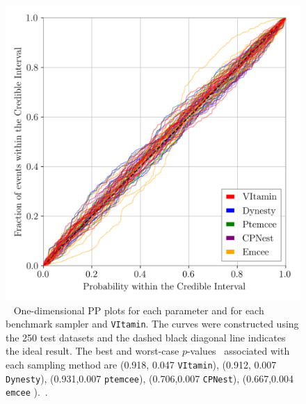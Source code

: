 %
%
\begin{figure}
    \includegraphics[width=\columnwidth]{latest_pp_plot.png}
    \caption[One-dimensional \ac{PP} plots for each parameter and for each benchmark sampler and \texttt{VItamin}.]{\label{fig:pp_plot}~ One-dimensional \ac{PP} plots for each parameter and for each benchmark sampler and \texttt{VItamin}. The curves were constructed using the 250 test datasets and the dashed black diagonal line indicates the ideal result. The best and worst-case $p$-values~ associated with each sampling method are (0.918,  0.047 \texttt{VItamin}), (0.912, 0.007 \texttt{Dynesty}), (0.931,0.007 \texttt{ptemcee}), 
    (0.706,0.007 \texttt{CPNest}), (0.667,0.004 \texttt{emcee} ).~. 
}
\end{figure}
%

